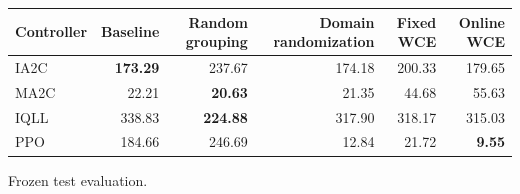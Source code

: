 \begin{tabular}{lrrrrr}
\hline
Controller & Baseline & Random grouping & Domain randomization & Fixed WCE & Online WCE \\
\hline
IA2C & \textbf{173.29} & 237.67 & 174.18 & 200.33 & 179.65 \\
MA2C & 22.21 & \textbf{20.63} & 21.35 & 44.68 & 55.63 \\
IQLL & 338.83 & \textbf{224.88} & 317.90 & 318.17 & 315.03 \\
PPO & 184.66 & 246.69 & 12.84 & 21.72 & \textbf{9.55} \\
\hline
\end{tabular}
Frozen test evaluation.
